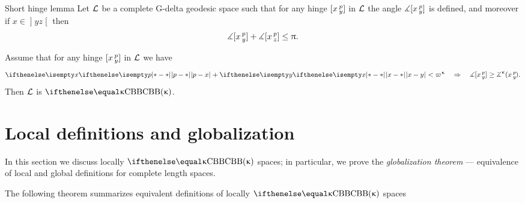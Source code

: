 \begin{thm}{Short hinge lemma}\label{lem:devel-glob}
Let $\mathcal{L}$ be a complete G-delta geodesic space such that for any hinge $[x\,{}^{p}_{y}]$ in $\mathcal{L}$ the angle $\measuredangle[x\,{}^{p}_{y}]$ is defined, 
and moreover if $x\in \mathopen{]}y z\mathclose{[}$ then
\[\mangle\hinge x p y+\mangle\hinge x p z\le \pi.\] 

Assume that  for any hinge $[x\,{}^{p}_{y}]$ in $\mathcal{L}$ we have
\[\dist{p}{ x}{}+\dist{x}{ y}{}
<\varpi\kappa
\quad\Rightarrow\quad 
\mangle\hinge x p y
\ge\angk\kappa x p y.\]
Then $\mathcal{L}$ is $\Alex\kappa$.
\end{thm}




\section{Local definitions and globalization}\label{sec:loc}


In this section we discuss locally $\Alex{\kappa}$ spaces; 
in particular, we prove the {}\emph{globalization theorem} --- equivalence of local and global definitions for complete length spaces.

The following theorem summarizes equivalent definitions of locally $\Alex{\kappa}$ spaces

